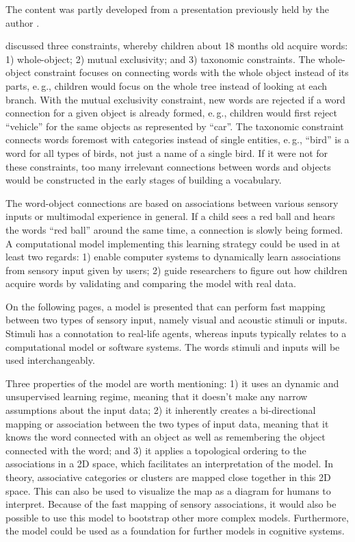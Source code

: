 \documentclass[twocolumn]{article}
\begin{document}
The content was partly developed from a presentation previously held by the author \parencite{walling_visual_2018}.

\textcite{markman_whole-object_1991} discussed three constraints, whereby children about 18 months old acquire words: 1) whole-object; 2) mutual exclusivity; and 3) taxonomic constraints. The whole-object constraint focuses on connecting words with the whole object instead of its parts, e.\,g., children would focus on the whole tree instead of looking at each branch. With the mutual exclusivity constraint, new words are rejected if a word connection for a given object is already formed, e.\,g., children would first reject \enquote{vehicle} for the same objects as represented by \enquote{car}. The taxonomic constraint connects words foremost with categories instead of single entities, e.\,g., \enquote{bird} is a word for all types of birds, not just a name of a single bird. If it were not for these constraints, too many irrelevant connections between words and objects would be constructed in the early stages of building a vocabulary.

The word-object connections are based on associations between various sensory inputs or multimodal experience in general. If a child sees a red ball and hears the words \enquote{red ball} around the same time, a connection is slowly being formed. A computational model implementing this learning strategy could be used in at least two regards: 1) enable computer systems to dynamically learn associations from sensory input given by users; 2) guide researchers to figure out how children acquire words by validating and comparing the model with real data.

On the following pages, a model is presented that can perform fast mapping between two types of sensory input, namely visual and acoustic stimuli or inputs. Stimuli has a connotation to real-life agents, whereas inputs typically relates to a computational model or software systems. The words stimuli and inputs will be used interchangeably.

Three properties of the model are worth mentioning: 1) it uses an dynamic and unsupervised learning regime, meaning that it doesn't make any narrow assumptions about the input data; 2) it inherently creates a bi-directional mapping or association between the two types of input data, meaning that it knows the word connected with an object as well as remembering the object connected with the word; and 3) it applies a topological ordering to the associations in a 2D space, which facilitates an interpretation of the model. In theory, associative categories or clusters are mapped close together in this 2D space. This can also be used to visualize the map as a diagram for humans to interpret. Because of the fast mapping of sensory associations, it would also be possible to use this model to bootstrap other more complex models. Furthermore, the model could be used as a foundation for further models in cognitive systems.
\end{document}
